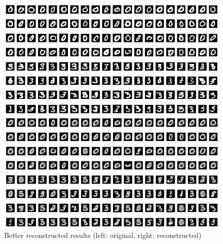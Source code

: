 \documentclass[12pt]{article}
\begin{document}
\begin{figure}[ht]
	\begin{minipage}[c]{0.5\linewidth}
	\includegraphics[scale=.25]{../res/testingOrigin0_3.png}
	\end{minipage}
	\begin{minipage}[c]{0.5\linewidth}
	\includegraphics[scale=.25]{../res/testingAvg0_3.png}
	\end{minipage}
	\caption{Better reconstructed results (left: original, right: reconstructed)}
\end{figure}
\end{document}

